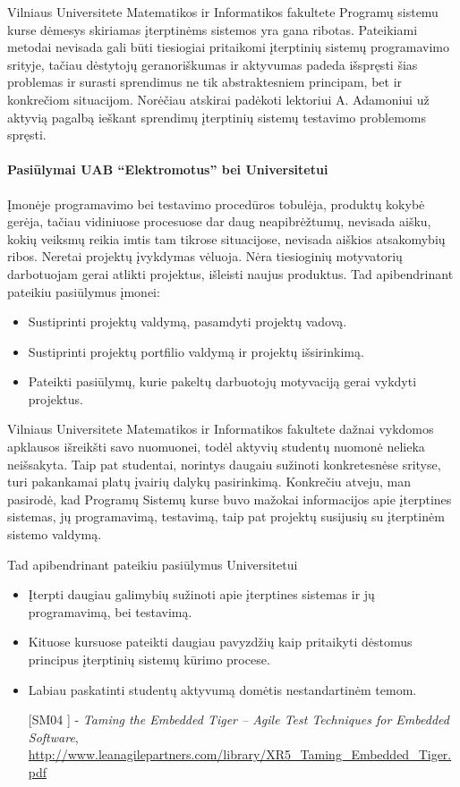 \documentclass[12pt, a4paper, lithuanian, final]{article}
\begin{document}
Vilniaus Universitete Matematikos ir Informatikos fakultete Programų sistemu kurse dėmesys skiriamas įterptinėms sistemos yra gana ribotas.
Pateikiami metodai nevisada gali būti tiesiogiai pritaikomi įterptinių sistemų programavimo srityje, tačiau dėstytojų geranoriškumas ir aktyvumas padeda išspręsti šias problemas ir surasti sprendimus ne tik abstraktesniem principam, bet ir konkrečiom situacijom.
Norėčiau atskirai padėkoti lektoriui A. Adamoniui už aktyvią pagalbą ieškant sprendimų įterptinių sistemų testavimo problemoms spręsti.




\paragraph{Pasiūlymai UAB "`Elektromotus"' bei Universitetui}

Įmonėje programavimo bei testavimo procedūros tobulėja, produktų kokybė gerėja, tačiau vidiniuose procesuose dar daug neapibrėžtumų, nevisada aišku, kokių veiksmų reikia imtis tam tikrose situacijose, nevisada aiškios atsakomybių ribos.
Neretai projektų įvykdymas vėluoja.
Nėra tiesioginių motyvatorių darbotuojam gerai atlikti projektus, išleisti naujus produktus.
Tad apibendrinant pateikiu pasiūlymus įmonei:

\begin{itemize}
	\item Sustiprinti projektų valdymą, pasamdyti projektų vadovą.
	\item Sustiprinti projektų portfilio valdymą ir projektų išsirinkimą.
	\item Pateikti pasiūlymų, kurie pakeltų darbuotojų motyvaciją gerai vykdyti projektus.
\end{itemize}


Vilniaus Universitete Matematikos ir Informatikos fakultete dažnai vykdomos apklausos išreikšti savo nuomuonei, todėl aktyvių studentų nuomonė nelieka neišsakyta.
Taip pat studentai, norintys daugaiu sužinoti konkretesnėse srityse, turi pakankamai platų įvairių dalykų pasirinkimą.
Konkrečiu atveju, man pasirodė, kad Programų Sistemų kurse buvo mažokai informacijos apie įterptines sistemas, jų programavimą, testavimą, taip pat projektų susijusių su įterptinėm sistemo valdymą.

Tad apibendrinant pateikiu pasiūlymus Universitetui
\begin{itemize}
	\item Įterpti daugiau galimybių sužinoti apie įterptines sistemas ir jų programavimą, bei testavimą.
	\item Kituose kursuose pateikti daugiau pavyzdžių kaip pritaikyti dėstomus principus įterptinių sistemų kūrimo procese.
	\item Labiau paskatinti studentų aktyvumą domėtis nestandartinėm temom.
\end{itemize}






\begin{itemize}
	\item [[SM04]] - \textit{Taming the Embedded Tiger – Agile Test Techniques for Embedded Software}, \url{http://www.leanagilepartners.com/library/XR5_Taming_Embedded_Tiger.pdf}

\end{itemize}
\end{document}
